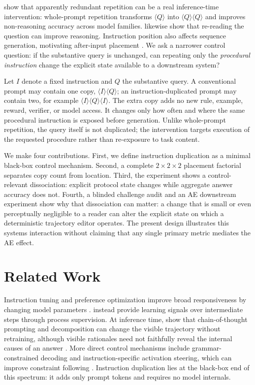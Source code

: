 \documentclass[10pt]{article}
\begin{document}
\citet{leviathan2025prompt} show that apparently redundant repetition can be a real inference-time intervention: whole-prompt repetition transforms $\langle Q\rangle$ into $\langle Q\rangle\langle Q\rangle$ and improves non-reasoning accuracy across model families. \citet{xu2023rereading} likewise show that re-reading the question can improve reasoning. Instruction position also affects sequence generation, motivating after-input placement \citep{liu2024position}. We ask a narrower control question: if the substantive query is unchanged, can repeating only the \emph{procedural instruction} change the explicit state available to a downstream system?

Let $I$ denote a fixed instruction and $Q$ the substantive query. A conventional prompt may contain one copy, $\langle I\rangle\langle Q\rangle$; an instruction-duplicated prompt may contain two, for example $\langle I\rangle\langle Q\rangle\langle I\rangle$. The extra copy adds no new rule, example, reward, verifier, or model access. It changes only how often and where the same procedural instruction is exposed before generation. Unlike whole-prompt repetition, the query itself is not duplicated; the intervention targets execution of the requested procedure rather than re-exposure to task content.

We make four contributions. First, we define instruction duplication as a minimal black-box control mechanism. Second, a complete $2\times2\times2$ placement factorial separates copy count from location. Third, the experiment shows a control-relevant dissociation: explicit protocol state changes while aggregate answer accuracy does not. Fourth, a blinded challenge audit and an AE downstream experiment show why that dissociation can matter: a change that is small or even perceptually negligible to a reader can alter the explicit state on which a deterministic trajectory editor operates. The present design illustrates this systems interaction without claiming that any single primary metric mediates the AE effect.

\section{Related Work}
Instruction tuning and preference optimization improve broad responsiveness by changing model parameters \citep{ouyang2022training}. \citet{lightman2024verify} instead provide learning signals over intermediate steps through process supervision. At inference time, \citet{wei2022cot} show that chain-of-thought prompting and decomposition can change the visible trajectory without retraining, although visible rationales need not faithfully reveal the internal causes of an answer \citep{turpin2023unfaithful}. More direct control mechanisms include grammar-constrained decoding \citep{geng2023grammar} and instruction-specific activation steering, which can improve constraint following \citep{stolfo2025steering}. Instruction duplication lies at the black-box end of this spectrum: it adds only prompt tokens and requires no model internals.
\end{document}
